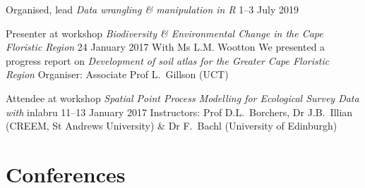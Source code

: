 \documentclass[10pt]{article}
\begin{document}
\begin{hangparas}{2em}{1}

Organised, lead \textit{Data wrangling \& manipulation in R}
                                                           \hfill 1--3 July 2019

Presenter at workshop \textit{Biodiversity \& Environmental Change in the Cape 
Floristic Region}                                  \hfill 24 January 2017 \break
With Ms L.M. Wootton                                                      \break
We presented a progress report on \textit{Development of soil atlas for the 
Greater Cape Floristic Region}                                            \break
Organiser: Associate Prof L.~Gillson (UCT)

Attendee at workshop \textit{Spatial Point Process Modelling for Ecological 
Survey Data with} inlabru                      \hfill 11--13 January 2017 \break
Instructors: Prof D.L.~Borchers, Dr J.B.~Illian (CREEM, St Andrews University) 
\& Dr F.~Bachl (University of Edinburgh)

\hfill

\end{hangparas}

\clearpage %

\section*{Conferences} %
\end{document}

